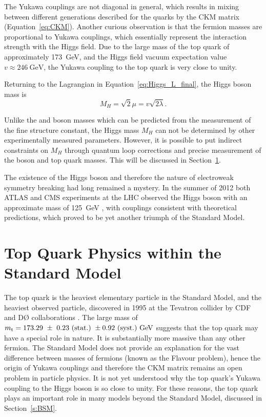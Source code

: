 The Yukawa couplings are not diagonal in general, which results in mixing between different generations described for
the quarks by the CKM matrix (Equation~\ref{eq:CKM}). Another curious observation is that the fermion masses are
proportional to Yukawa couplings, which essentially represent the interaction strength with the Higgs field. Due to the
large mass of the top quark of approximately \SI{173}{\GeV}, and the Higgs field vacuum expectation value
$v\approx\SI{246}{\GeV}$, the Yukawa coupling to the top quark is very close to unity.

Returning to the Lagrangian in Equation~\ref{eq:Higgs_L_final}, the Higgs boson mass is
\begin{equation}
M_H = \sqrt{2} \mu = v \sqrt{2\lambda}.
\end{equation}

Unlike the \W and \Z boson masses which can be predicted from the measurement of the fine structure constant, the Higgs
mass $M_H$ can not be determined by other experimentally measured parameters. However, it is possible to put indirect
constraints on $M_H$ through quantum loop corrections and precise measurement of the \W boson and top quark masses. This
will be discussed in Section~\ref{s:top_quak_physics}.

The existence of the Higgs boson and therefore the nature of electroweak symmetry breaking had long remained a mystery.
In the summer of 2012 both ATLAS and CMS experiments at the LHC observed the Higgs boson with an approximate mass of
\SI{125}{\GeV} \autocite{ATLAS_higgs_observation, CMS_higgs_observation}, with couplings consistent with theoretical
predictions, which proved to be yet another triumph of the Standard Model.

\newpage
\section{Top Quark Physics within the Standard Model}
\label{s:top_quak_physics}
The top quark is the heaviest elementary particle in the Standard Model, and the heaviest observed particle, discovered
in 1995 at the Tevatron collider by CDF and D{\O} collaborations \autocite{CDF_top_observation, D0_top_observation}. The
large mass of $\mtop = 173.29\ \pm\ 0.23\ \textrm{(stat.)}\ \pm 0.92\ \textrm{(syst.)}\ \textrm{GeV}$
\autocite{LHC_top_mass_combination} suggests that the top quark may have a special role in nature. It is substantially
more massive than any other fermion. The Standard Model does not provide an explanation for the vast difference between
masses of fermions (known as the Flavour problem), hence the origin of Yukawa couplings and therefore the CKM matrix
remains an open problem in particle physics. It is not yet understood why the top quark's Yukawa coupling to the Higgs
boson is so close to unity. For these reasons, the top quark plays an important role in many models beyond the Standard
Model, discussed in Section~\ref{s:BSM}.

